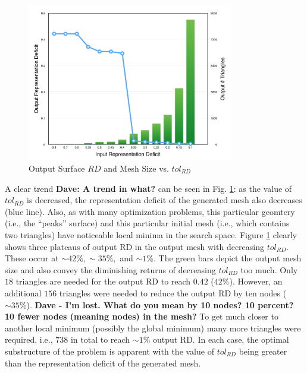\begin{figure}[h!]
  \begin{center}
  \includegraphics[width=90mm]{Figures/RDvsMeshSize.png}
  \caption{Output Surface $RD$ and Mesh Size vs. $tol_{RD}$}
  \label{fig_RDvsMeshSize}
  \end{center}
\end{figure}

A clear trend {\bf{Dave: A trend in what?}} can be seen in 
Fig. \ref{fig_RDvsMeshSize}: as the value of
$tol_{RD}$ is decreased, the representation deficit of the generated mesh
also decreases (blue line). Also, as with many optimization problems,
this particular geomtery (i.e., the ``peaks'' surface) and this particular 
initial mesh (i.e., which contains two triangles) have noticeable local 
minima in the search space.
Figure \ref{fig_RDvsMeshSize} clearly shows three plateaus of output
RD in the output mesh with decreasing $tol_{RD}$. These occur at
$\sim42\%, \sim35\%,$ and $\sim1\%$. The green bars depict the output
mesh size and also convey the diminishing returns of decreasing
$tol_{RD}$ too much. Only $18$ triangles are needed for the output RD to
reach $0.42$ ($42\%$). However, an additional $156$ triangles were
needed to reduce the output RD by ten nodes ($\sim 35\%$). {\bf{Dave - 
I'm lost. What do you mean by 10 nodes?  10 percent?  10 fewer nodes 
(meaning nodes) in the mesh?}}  To get much closer to another local 
minimum (possibly the global minimum) many
more triangles were required, i.e., $738$ in total to reach $\sim 1\%$ 
output RD. In each case, the optimal substructure of the problem is 
apparent with the value of $tol_{RD}$ being greater than the 
representation deficit of the generated mesh.
